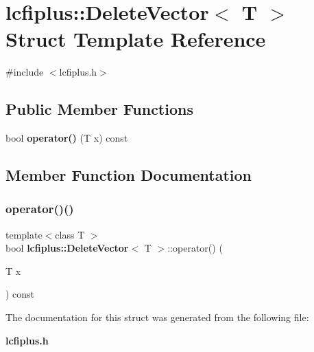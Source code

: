 \section{lcfiplus\+:\+:Delete\+Vector$<$ T $>$ Struct Template Reference}
\label{structlcfiplus_1_1DeleteVector}


{\ttfamily \#include $<$lcfiplus.\+h$>$}

\subsection*{Public Member Functions}
\begin{DoxyCompactItemize}
\item 
bool \textbf{ operator()} (T x) const
\end{DoxyCompactItemize}


\subsection{Member Function Documentation}
\mbox{\label{structlcfiplus_1_1DeleteVector_a6d2ede8320919fff94b861252a6ffd14}} 
\subsubsection{operator()()}
{\footnotesize\ttfamily template$<$class T $>$ \\
bool \textbf{ lcfiplus\+::\+Delete\+Vector}$<$ T $>$\+::operator() (\begin{DoxyParamCaption}\item[{T}]{x }\end{DoxyParamCaption}) const\hspace{0.3cm}{\ttfamily [inline]}}



The documentation for this struct was generated from the following file\+:\begin{DoxyCompactItemize}
\item 
\textbf{ lcfiplus.\+h}\end{DoxyCompactItemize}
